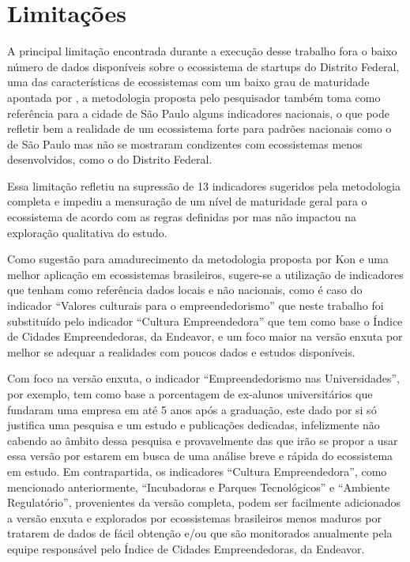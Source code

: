 \section{Limitações}
\label{subsection:limitações}

A principal limitação encontrada durante a execução desse trabalho fora o baixo número de dados disponíveis sobre o ecossistema de startups do Distrito Federal, uma das características de ecossistemas com um baixo grau de maturidade apontada por , a metodologia proposta pelo pesquisador também toma como referência para a cidade de São Paulo alguns indicadores nacionais, o que pode refletir bem a realidade de um ecossistema forte para padrões nacionais como o de São Paulo mas não se mostraram condizentes com ecossistemas menos desenvolvidos, como o do Distrito Federal.

Essa limitação refletiu na supressão de 13 indicadores sugeridos pela metodologia completa e impediu a mensuração de um nível de maturidade geral para o ecossistema de acordo com as regras definidas por  mas não impactou na exploração qualitativa do estudo.

Como sugestão para amadurecimento da metodologia proposta por Kon e uma melhor aplicação em ecossistemas brasileiros, sugere-se a utilização de indicadores que tenham como referência dados locais e não nacionais, como é caso do indicador ``Valores culturais para o empreendedorismo'' que neste trabalho foi substituído pelo indicador ``Cultura Empreendedora'' que tem como base o Índice de Cidades Empreendedoras, da Endeavor, e um foco maior na versão enxuta por melhor se adequar a realidades com poucos dados e estudos disponíveis. 

Com foco na versão enxuta, o indicador ``Empreendedorismo nas Universidades'', por exemplo, tem como base a porcentagem de ex-alunos universitários que fundaram uma empresa em até 5 anos após a graduação, este dado por si só justifica uma pesquisa e um estudo e publicações dedicadas, infelizmente não cabendo ao âmbito dessa pesquisa e provavelmente das que irão se propor a usar essa versão por estarem em busca de uma análise breve e rápida do ecossistema em estudo. Em contrapartida, os indicadores ``Cultura Empreendedora'', como mencionado anteriormente, ``Incubadoras e Parques Tecnológicos'' e ``Ambiente Regulatório'', provenientes da versão completa, podem ser facilmente adicionados a versão enxuta e explorados por ecossistemas brasileiros menos maduros por tratarem de dados de fácil obtenção e/ou que são monitorados anualmente pela equipe responsável pelo Índice de Cidades Empreendedoras, da Endeavor.

